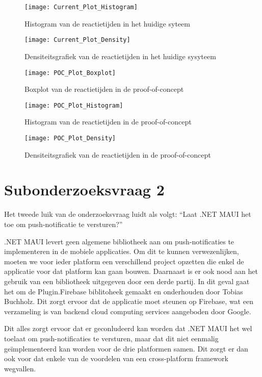 \begin{figure}[H]
    \texttt{[image: Current\_Plot\_Histogram]}
    \centering
    \caption{Histogram van de reactietijden in het huidige syteem}
    \label{fig:httpLongPolling}
\end{figure}

\begin{figure}[H]
    \texttt{[image: Current\_Plot\_Density]}
    \centering
    \caption{Densiteitsgrafiek van de reactietijden in het huidige sysyteem}
    \label{fig:httpLongPolling}
\end{figure}

\begin{figure}[H]
    \texttt{[image: POC\_Plot\_Boxplot]}
    \centering
    \caption{Boxplot van de reactietijden in de proof-of-concept}
    \label{fig:httpLongPolling}
\end{figure}

\begin{figure}[H]
    \texttt{[image: POC\_Plot\_Histogram]}
    \centering
    \caption{Histogram van de reactietijden in de proof-of-concept}
    \label{fig:httpLongPolling}
\end{figure}

\begin{figure}[H]
    \texttt{[image: POC\_Plot\_Density]}
    \centering
    \caption{Densiteitsgrafiek van de reactietijden in de proof-of-concept}
    \label{fig:httpLongPolling}
\end{figure}

\section{Subonderzoeksvraag 2}
Het tweede luik van de onderzoeksvraag luidt als volgt: ``Laat .NET MAUI het toe om push-notificatie te versturen?''

.NET MAUI levert geen algemene bibliotheek aan om push-notificaties te implementeren in de mobiele applicaties. Om dit te kunnen verwezenlijken, moeten we voor ieder platform een verschillend project opzetten die enkel de applicatie voor dat platform kan gaan bouwen. Daarnaast is er ook nood aan het gebruik van een bibliotheek uitgegeven door een derde partij. In dit geval gaat het om de Plugin.Firebase biblitoheek gemaakt en onderhouden door Tobias Buchholz. Dit zorgt ervoor dat de applicatie moet steunen op Firebase, wat een verzameling is van backend cloud computing services aangeboden door Google.

Dit alles zorgt ervoor dat er geconludeerd kan worden dat .NET MAUI het wel toelaat om push-notificaties te versturen, maar dat dit niet eenmalig geïmplementeerd kan worden voor de drie platformen samen. Dit zorgt er dan ook voor dat enkele van de voordelen van een cross-platform framework wegvallen.

